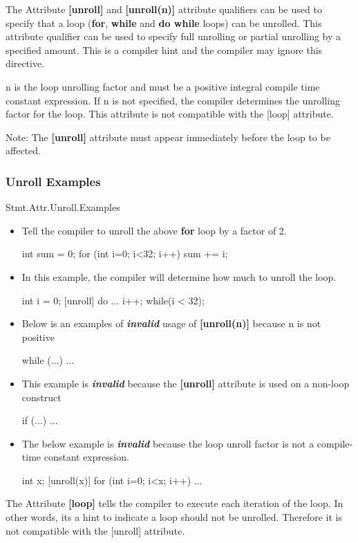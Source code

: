 The Attribute \textbf{[unroll]} and \textbf{[unroll(n)]} attribute qualifiers can be used to specify that a loop (\textbf{for}, \textbf{while} and \textbf{do while} loops) can be unrolled. This attribute qualifier can be used to specify full unrolling or partial unrolling by a specified amount. This is a compiler hint and the compiler may ignore this directive.

n is the loop unrolling factor and must be a positive integral compile time constant expression. If n is not specified, the compiler determines the unrolling factor for the loop. This attribute is not compatible with the [loop] attribute.

Note:  The \textbf{[unroll]} attribute  must appear immediately before the loop to be affected.

\subsubsection{Unroll Examples}{Stmt.Attr.Unroll.Examples}
\begin{itemize}
\item  Tell the compiler to unroll the above \textbf{for} loop by a factor of 2.
\begin{HLSL}
[unroll(2)]
int sum = 0;
for (int i=0; i<32; i++)
    sum += i;
\end{HLSL}
\item In this example, the compiler will determine how much to unroll the loop.
\begin{HLSL}
int i = 0;
[unroll]
do {
    ...
    i++;
} while(i < 32);
\end{HLSL}
\item Below is an  examples of \textbf{\emph{invalid}} usage of \textbf{[unroll(n)]} because n is not positive
\begin{HLSL}
[unroll(-1)]
while (...)
{
    ...
}
\end{HLSL}
\item This example is \textbf{\emph{invalid}} because the \textbf{[unroll]} attribute is used on a non-loop construct
\begin{HLSL}
[unroll]
if (...)
{
    ...
}
\end{HLSL}
\item The below example is \textbf{\emph{invalid}} because the loop unroll factor is not a compile-time constant expression.
\begin{HLSL}
    int x;
    [unroll(x)]
    for (int i=0; i<x; i++)
    {
        ...
    }
\end{HLSL}
\end{itemize}
The Attribute \textbf{[loop]} tells the compiler to execute each iteration of the loop. In other words, its a hint to indicate a loop should not be unrolled. Therefore it is not compatible with the [unroll] attribute.

